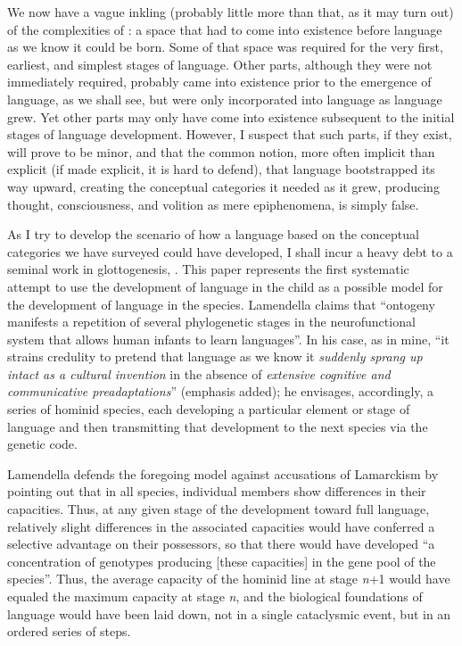
We now have a vague inkling (probably little more than that, as it may turn out) of the complexities of : a space that had to come into existence before language as we know it could be born. Some of that space was required for the very first, earliest, and simplest stages of language. Other parts, although they were not
immediately required, probably came into existence prior to the emergence of language, as we shall see, but were only incorporated into language as language grew. Yet other parts may only have come into existence subsequent to the initial stages of language development. However, I suspect that such parts, if they exist, will prove to be minor, and that the common notion, more often implicit than explicit (if made explicit, it is hard to defend), that language bootstrapped its way upward, creating the conceptual categories it needed as it grew, producing thought, consciousness, and volition as mere epiphenomena, is simply false.

As I try to develop the scenario of how a language based on the conceptual categories we have surveyed could have developed, I shall incur a heavy debt to a seminal work in glottogenesis, \citet{Lamendella1976}. This paper represents the first systematic attempt to use the development of language in the child as a possible model for the development of language in the species. Lamendella claims that ``ontogeny manifests a repetition of several phylogenetic stages in the neurofunctional system that allows human infants to learn languages''. In his case, as in mine, ``it strains credulity to pretend that language as we know it \textit{suddenly sprang up intact as a cultural invention} in the absence of \textit{extensive cognitive and communicative preadaptations}'' (emphasis added); he envisages, accordingly, a series of hominid species, each developing a particular element or stage of language and then transmitting that development to the next species via the genetic code. 

Lamendella defends the foregoing model against accusations of Lamarckism by pointing out that in all species, individual members show differences in their capacities. Thus, at any given stage of the development toward full language, relatively slight differences in the associated capacities would have conferred a selective advantage on their possessors, so that there would have developed ``a concentration of genotypes producing [these capacities] in the gene pool of the species''. Thus, the average capacity of the hominid line at stage \textit{n}+1 would have equaled the maximum capacity at stage \textit{n}, and the
biological foundations of language would have been laid down, not in a single cataclysmic event, but in an ordered series of steps.


